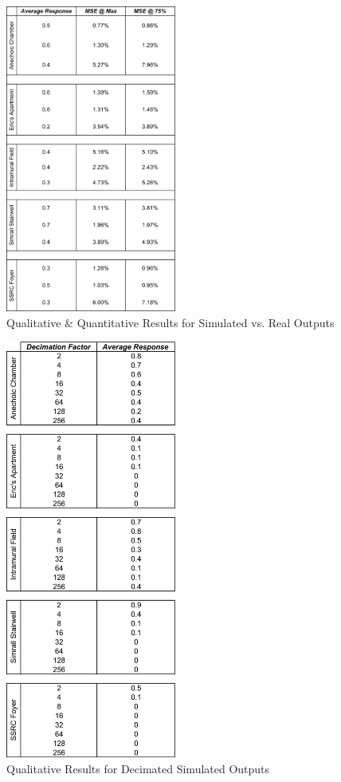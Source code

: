 \documentclass[letterpaper, 11pt, onecolumn, oneside]{article}
\begin{document}
\begin{figure}[ht]
    \includegraphics[width=0.5\textwidth]{"img/fig_Results"}
    \centering
    \caption{Qualitative \& Quantitative Results for Simulated vs. Real Outputs}
    \label{fig:mseResults}
\end{figure}

\begin{figure}[ht]
    \includegraphics[width=0.5\textwidth]{"img/fig_DecimationResults"}
    \centering
    \caption{Qualitative Results for Decimated Simulated Outputs}
    \label{fig:decimatedResults}
\end{figure}
\end{document}
